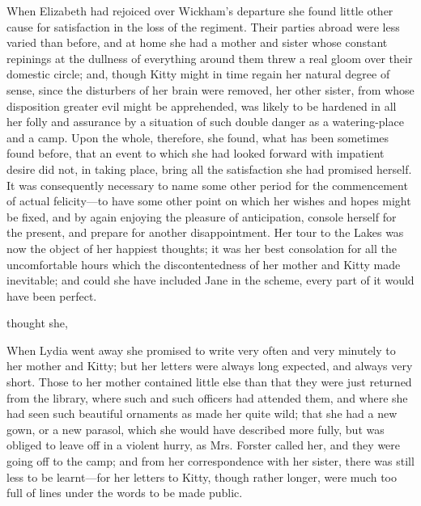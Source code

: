 When Elizabeth had rejoiced over Wickham's departure she found little other cause for satisfaction in the loss of the regiment. Their parties abroad were less varied than before, and at home she had a mother and sister whose constant repinings at the dullness of everything around them threw a real gloom over their domestic circle; and, though Kitty might in time regain her natural degree of sense, since the disturbers of her brain were removed, her other sister, from whose disposition greater evil might be apprehended, was likely to be hardened in all her folly and assurance by a situation of such double danger as a watering-place and a camp. Upon the whole, therefore, she found, what has been sometimes found before, that an event to which she had looked forward with impatient desire did not, in taking place, bring all the satisfaction she had promised herself. It was consequently necessary to name some other period for the commencement of actual felicity---to have some other point on which her wishes and hopes might be fixed, and by again enjoying the pleasure of anticipation, console herself for the present, and prepare for another disappointment. Her tour to the Lakes was now the object of her happiest thoughts; it was her best consolation for all the uncomfortable hours which the discontentedness of her mother and Kitty made inevitable; and could she have included Jane in the scheme, every part of it would have been perfect.

 thought she, 

When Lydia went away she promised to write very often and very minutely to her mother and Kitty; but her letters were always long expected, and always very short. Those to her mother contained little else than that they were just returned from the library, where such and such officers had attended them, and where she had seen such beautiful ornaments as made her quite wild; that she had a new gown, or a new parasol, which she would have described more fully, but was obliged to leave off in a violent hurry, as Mrs. Forster called her, and they were going off to the camp; and from her correspondence with her sister, there was still less to be learnt---for her letters to Kitty, though rather longer, were much too full of lines under the words to be made public.

